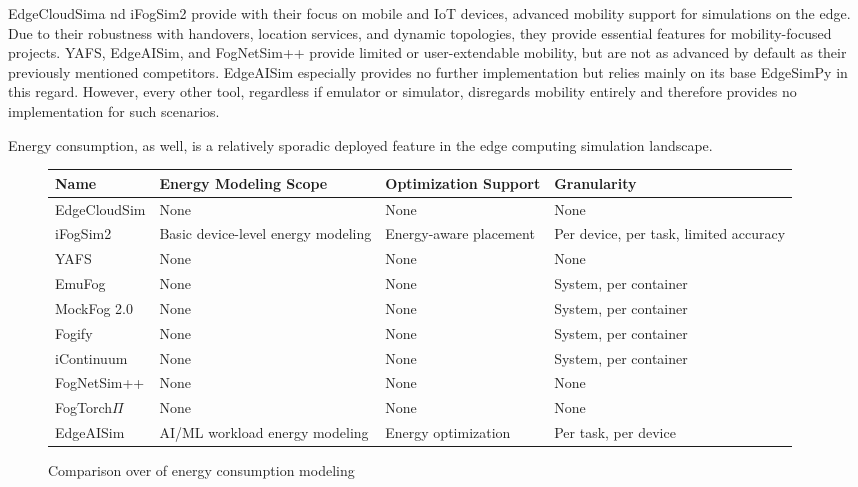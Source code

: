 EdgeCloudSima nd iFogSim2 provide with their focus on mobile and IoT devices, advanced mobility support for simulations on the edge.
Due to their robustness with handovers, location services, and dynamic topologies, they provide essential features for mobility-focused projects.
YAFS, EdgeAISim, and FogNetSim++ provide limited or user-extendable mobility, but are not as advanced by default as their previously mentioned competitors.
EdgeAISim especially provides no further implementation but relies mainly on its base EdgeSimPy in this regard.
However, every other tool, regardless if emulator or simulator, disregards mobility entirely and therefore provides no implementation for such scenarios.

Energy consumption, as well, is a relatively sporadic deployed feature in the edge computing simulation landscape.
\begin{figure}[H]
  \centering
  \begin{tabularx}{\textwidth}{ l | X | X | X }
    \hline
    \textbf{Name} & \textbf{Energy Modeling Scope} & \textbf{Optimization Support} & \textbf{Granularity}\\
    \hline\hline
    EdgeCloudSim  & None                                & None                    & None \\\hline
    iFogSim2      & Basic device-level energy modeling  & Energy-aware placement  & Per device, per task, limited accuracy \\\hline
    YAFS          & None                                & None                    & None \\\hline
    EmuFog        & None                                & None                    & System, per container \\\hline
    MockFog 2.0   & None                                & None                    & System, per container \\\hline
    Fogify        & None                                & None                    & System, per container \\\hline
    iContinuum    & None                                & None                    & System, per container \\\hline
    FogNetSim++   & None                                & None                    & None \\\hline
    FogTorch$\Pi$ & None                                & None                    & None \\\hline
    EdgeAISim     & AI/ML workload energy modeling      & Energy optimization     & Per task, per device \\\hline
  \end{tabularx}
  \caption{Comparison over of energy consumption modeling}
  \label{tab:analysis-energy}
\end{figure}

